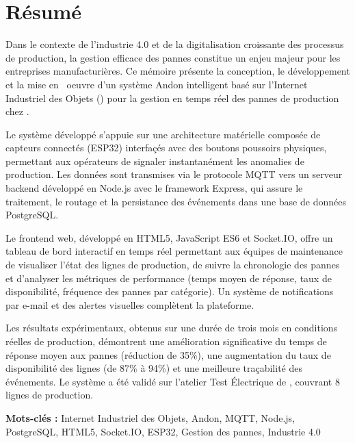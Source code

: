 \chapter*{R\'esum\'e}

Dans le contexte de l'industrie 4.0 et de la digitalisation croissante des processus de production, la gestion efficace des pannes constitue un enjeu majeur pour les entreprises manufacturi\`eres. Ce m\'emoire pr\'esente la conception, le d\'eveloppement et la mise en \ oeuvre d'un syst\`eme Andon intelligent bas\'e sur l'Internet Industriel des Objets (\iiot) pour la gestion en temps r\'eel des pannes de production chez \sews.

Le syst\`eme d\'evelopp\'e s'appuie sur une architecture mat\'erielle compos\'ee de capteurs connect\'es (ESP32) interfa\c{c}\'es avec des boutons poussoirs physiques, permettant aux op\'erateurs de signaler instantan\'ement les anomalies de production. Les donn\'ees sont transmises via le protocole MQTT vers un serveur backend d\'evelopp\'e en Node.js avec le framework Express, qui assure le traitement, le routage et la persistance des \'ev\'enements dans une base de donn\'ees PostgreSQL.

Le frontend web, d\'evelopp\'e en HTML5, JavaScript ES6 et Socket.IO, offre un tableau de bord interactif en temps r\'eel permettant aux \'equipes de maintenance de visualiser l'\'etat des lignes de production, de suivre la chronologie des pannes et d'analyser les m\'etriques de performance (temps moyen de r\'eponse, taux de disponibilit\'e, fr\'equence des pannes par cat\'egorie). Un syst\`eme de notifications par e-mail et des alertes visuelles compl\`etent la plateforme.

Les r\'esultats exp\'erimentaux, obtenus sur une dur\'ee de trois mois en conditions r\'eelles de production, d\'emontrent une am\'elioration significative du temps de r\'eponse moyen aux pannes (r\'eduction de 35\%), une augmentation du taux de disponibilit\'e des lignes (de 87\% \`a 94\%) et une meilleure tra\c{c}abilit\'e des \'ev\'enements. Le syst\`eme a \'et\'e valid\'e sur l'atelier Test \'Electrique de \sews, couvrant 8 lignes de production.

\vspace{1em}
\noindent\textbf{Mots-cl\'es :} Internet Industriel des Objets, Andon, MQTT, Node.js, PostgreSQL, HTML5, Socket.IO, ESP32, Gestion des pannes, Industrie 4.0
